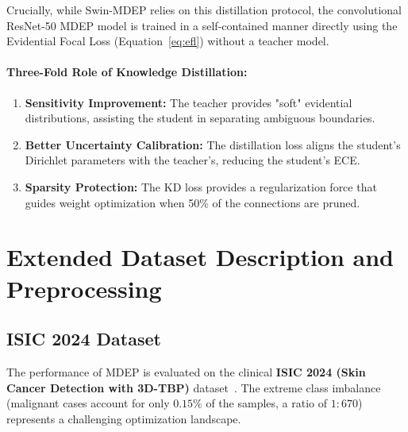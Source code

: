 \documentclass[letterpaper]{article} %
\begin{document}
Crucially, while Swin-MDEP relies on this distillation protocol, the convolutional ResNet-50 MDEP model is trained in a self-contained manner directly using the Evidential Focal Loss (Equation~\ref{eq:efl}) without a teacher model.

\paragraph{Three-Fold Role of Knowledge Distillation:}
\begin{enumerate}
    \item \textbf{Sensitivity Improvement:} The teacher provides "soft" evidential distributions, assisting the student in separating ambiguous boundaries.
    \item \textbf{Better Uncertainty Calibration:} The distillation loss aligns the student's Dirichlet parameters with the teacher's, reducing the student's ECE.
    \item \textbf{Sparsity Protection:} The KD loss provides a regularization force that guides weight optimization when 50\% of the connections are pruned.
\end{enumerate}


\section{Extended Dataset Description and Preprocessing}
\subsection{ISIC 2024 Dataset}\label{subsec:isic}

The performance of MDEP is evaluated on the clinical \textbf{ISIC 2024 (Skin Cancer Detection with 3D-TBP)} dataset~\cite{isic2024, codella2019skin, tschandl2018ham10000}. The extreme class imbalance (malignant cases account for only $0.15\%$ of the samples, a ratio of $1{:}670$) represents a challenging optimization landscape.
\end{document}
